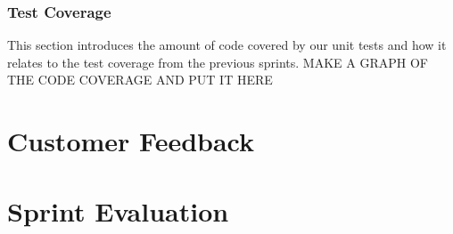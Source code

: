 \subsubsection{Test Coverage}
This section introduces the amount of code covered by our unit tests and how it relates to the test coverage from the previous sprints.
 MAKE A GRAPH OF THE CODE COVERAGE AND PUT IT HERE

 


\section{Customer Feedback}


\section{Sprint Evaluation}


